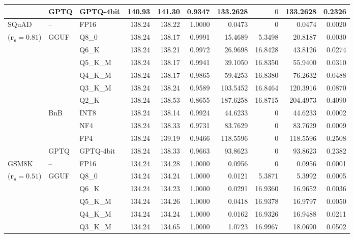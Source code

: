 \begin{longtable}{ll l rrrrrrr}
 & GPTQ & GPTQ-4bit & 140.93 & 141.30 & \cellcolor{red!18} 0.9347 & \cellcolor{red!18} 133.2628 & \cellcolor{cyan!12} $0$ & \cellcolor{red!18} 133.2628 & \cellcolor{red!18} 0.2326 \\
\midrule
SQuAD & -- & FP16 & 138.24 & 138.22 & 1.0000 & 0.0473 & \cellcolor{cyan!12} $0$ & 0.0474 & 0.0020 \\
{\small ($\mathbf{r_s{=}0.81}$)} & GGUF & Q8\_0 & 138.24 & 138.17 & 0.9991 & 15.4689 & 5.3498 & 20.8187 & 0.0030 \\
 &  & Q6\_K & 138.24 & 138.21 & 0.9972 & 26.9698 & 16.8428 & 43.8126 & 0.0274 \\
 &  & Q5\_K\_M & 138.24 & 138.17 & 0.9941 & 39.1050 & 16.8350 & 55.9400 & 0.0310 \\
 &  & Q4\_K\_M & 138.24 & 138.17 & 0.9865 & 59.4253 & 16.8380 & 76.2632 & 0.0488 \\
 &  & Q3\_K\_M & 138.24 & 138.24 & 0.9589 & 103.5452 & 16.8464 & 120.3916 & 0.0870 \\
 &  & Q2\_K & 138.24 & 138.53 & \cellcolor{red!18} 0.8655 & \cellcolor{red!18} 187.6258 & 16.8715 & \cellcolor{red!18} 204.4973 & \cellcolor{red!18} 0.4090 \\
 & BnB & INT8 & 138.24 & 138.14 & 0.9924 & 44.6233 & \cellcolor{cyan!12} $0$ & 44.6233 & 0.0002 \\
 &  & NF4 & 138.24 & 138.33 & 0.9731 & 83.7629 & \cellcolor{cyan!12} $0$ & 83.7629 & 0.0009 \\
 &  & FP4 & 138.24 & 139.19 & \cellcolor{red!18} 0.9466 & \cellcolor{red!18} 118.5596 & \cellcolor{cyan!12} $0$ & \cellcolor{red!18} 118.5596 & \cellcolor{red!18} 0.2508 \\
 & GPTQ & GPTQ-4bit & 138.24 & 138.33 & 0.9663 & 93.8623 & \cellcolor{cyan!12} $0$ & 93.8623 & 0.2382 \\
\midrule
GSM8K & -- & FP16 & 134.24 & 134.28 & 1.0000 & 0.0956 & \cellcolor{cyan!12} $0$ & 0.0956 & 0.0001 \\
{\small ($\mathbf{r_s{=}0.51}$)} & GGUF & Q8\_0 & 134.24 & 134.24 & 1.0000 & 0.0121 & 5.3871 & 5.3992 & 0.0005 \\
 &  & Q6\_K & 134.24 & 134.23 & 1.0000 & 0.0291 & 16.9360 & 16.9652 & 0.0036 \\
 &  & Q5\_K\_M & 134.24 & 134.26 & 1.0000 & 0.0418 & 16.9378 & 16.9797 & 0.0050 \\
 &  & Q4\_K\_M & 134.24 & 134.24 & 1.0000 & 0.0162 & 16.9326 & 16.9488 & 0.0211 \\
 &  & Q3\_K\_M & 134.24 & 134.65 & 1.0000 & 1.0723 & 16.9967 & 18.0690 & 0.0502 \\

\end{longtable}
